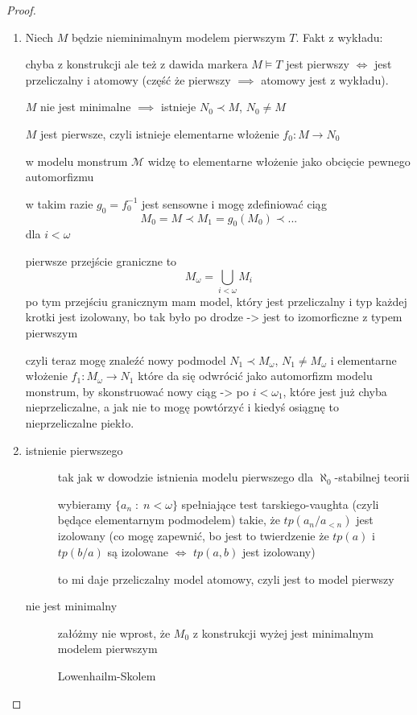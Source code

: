 \begin{proof}
  \begin{enumerate}
    \item Niech $M$ będzie nieminimalnym modelem pierwszym $T$. Fakt z wykładu:
      \begin{fact}{chyba z konstrukcji ale też z dawida markera}{}
        $M\models T$ jest pierwszy $\iff$ jest przeliczalny i atomowy (część że pierwszy $\implies$ atomowy jest z wykładu).
      \end{fact}
      $M$ nie jest minimalne $\implies$ istnieje $N_0\prec M$, $N_0\neq M$

      $M$ jest pierwsze, czyli istnieje elementarne włożenie $f_0:M\to N_0$

      w modelu monstrum $\mathcal{M}$ widzę to elementarne włożenie jako obcięcie pewnego automorfizmu

      w takim razie $g_0=f_0^{-1}$ jest sensowne i mogę zdefiniować ciąg
      $$M_0=M\prec M_1=g_0(M_0)\prec ...$$
      dla $i<\omega$

      pierwsze przejście graniczne to
      $$M_\omega=\bigcup_{i<\omega} M_i$$
      po tym przejściu granicznym mam model, który jest przeliczalny i typ każdej krotki jest izolowany, bo tak było po drodze -> jest to izomorficzne z typem pierwszym

      czyli teraz mogę znaleźć nowy podmodel $N_1\prec M_\omega$, $N_1\neq M_\omega$ i elementarne włożenie $f_1:M_\omega\to N_1$ które da się odwrócić jako automorfizm modelu monstrum, by skonstruować nowy ciąg -> po $i<\omega_1$, które jest już chyba nieprzeliczalne, a jak nie to mogę powtórzyć i kiedyś osiągnę to nieprzeliczalne piekło.

    \item 
      \begin{description}
        \item[istnienie pierwszego] tak jak w dowodzie istnienia modelu pierwszego dla $\aleph_0$-stabilnej teorii 

          wybieramy $\{a_n\;:\;n<\omega\}$ spełniające test tarskiego-vaughta (czyli będące elementarnym podmodelem) takie, że $tp(a_n/a_{<n})$ jest izolowany (co mogę zapewnić, bo jest to twierdzenie że $tp(a)$ i $tp(b/a)$ są izolowane $\iff$ $tp(a,b)$ jest izolowany)

          to mi daje przeliczalny model atomowy, czyli jest to model pierwszy
        \item[nie jest minimalny] załóżmy nie wprost, że $M_0$ z konstrukcji wyżej jest minimalnym modelem pierwszym


          Lowenhailm-Skolem
      \end{description}

  \end{enumerate}
\end{proof}



